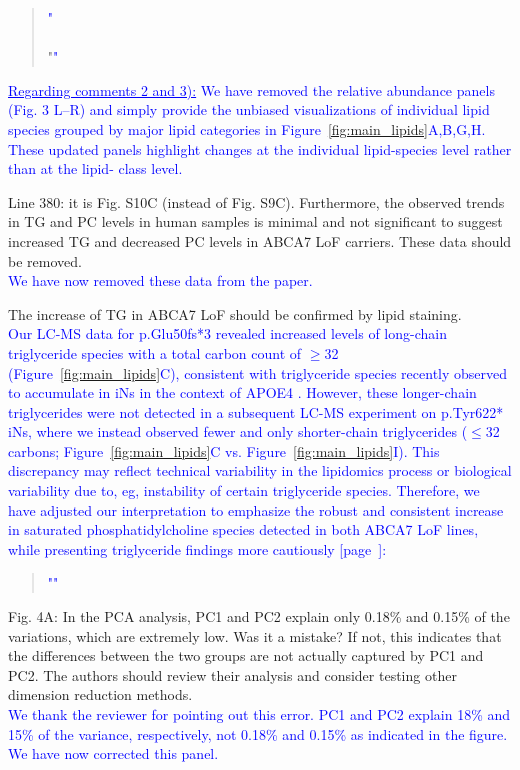 \begin{quote}
	\textcolor{blue}{"}\quoteA\\\\
	\quoteB"\textcolor{blue}{"}
\end{quote}  
\textcolor{blue}{\underline{Regarding comments 2 and 3):} We have removed the relative abundance panels (Fig. 3 L–R) and simply provide the unbiased visualizations of individual lipid species grouped by major lipid categories in Figure~\ref{fig:main_lipids}A,B,G,H. These updated panels highlight changes at the individual lipid-species level rather than at the lipid- class level.}

Line 380: it is Fig. S10C (instead of Fig. S9C). Furthermore, the observed trends in TG and PC levels in human samples is minimal and not significant to suggest increased TG and decreased PC levels in ABCA7 LoF carriers. These data should be removed.\\
 \textcolor{blue}{We have now removed these data from the paper.}

The increase of TG in ABCA7 LoF should be confirmed by lipid staining.\\
\textcolor{blue}{Our LC-MS data for p.Glu50fs*3 revealed increased levels of long-chain triglyceride species with a total carbon count of $\geq$32 (Figure~\ref{fig:main_lipids}C), consistent with triglyceride species recently observed to accumulate in iNs in the context of APOE4 \cite{Haney2024-bp}. However, these longer-chain triglycerides were not detected in a subsequent LC-MS experiment on p.Tyr622* iNs, where we instead observed fewer and only shorter-chain triglycerides ($\leq$32 carbons; Figure~\ref{fig:main_lipids}C vs. Figure~\ref{fig:main_lipids}I). This discrepancy may reflect technical variability in the lipidomics process or biological variability due to, eg, instability of certain triglyceride species. Therefore, we have adjusted our interpretation to emphasize the robust and consistent increase in saturated phosphatidylcholine species detected in both ABCA7 LoF lines, while presenting triglyceride findings more cautiously [page~\pageref{quoteH-label}]:}
\begin{quote}
	\textcolor{blue}{"\quoteH"}
\end{quote}

Fig. 4A: In the PCA analysis, PC1 and PC2 explain only 0.18\% and 0.15\% of the variations, which are extremely low. Was it a mistake? If not, this indicates that the differences between the two groups are not actually captured by PC1 and PC2. The authors should review their analysis and consider testing other dimension reduction methods.\\
\textcolor{blue}{We thank the reviewer for pointing out this error. PC1 and PC2 explain 18\% and 15\% of the variance, respectively, not 0.18\% and 0.15\% as indicated in the figure. We have now corrected this panel.}

